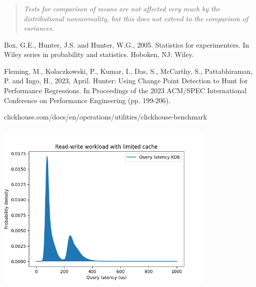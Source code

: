 \documentclass[usenames,dvipsnames, 18pt, compress, aspectratio=169]{beamer}
\begin{document}
\begin{frame}
    \frametitle{}
    \begin{center}
        \blockquote{\it Tests for comparison of means are not affected very much by
            the distributional nonnormality, but this does not extend to the
            comparison of variances.}

        \begin{flushright}
            \fontsize{10pt}{0}\selectfont
            Box, G.E., Hunter, J.S. and Hunter, W.G., 2005. Statistics for
            experimenters. In Wiley series in probability and statistics. Hoboken,
            NJ: Wiley.
        \end{flushright}

    \end{center}

    \linespread{0.5}
    \vspace{0.5cm}
    \color{black}\fontsize{6pt}{0}\selectfont
        Fleming, M., Kolaczkowski, P., Kumar, I., Das, S., McCarthy, S.,
        Pattabhiraman, P. and Ingo, H., 2023, April. Hunter: Using Change Point
        Detection to Hunt for Performance Regressions. In Proceedings of the
        2023 ACM/SPEC International Conference on Performance Engineering (pp.
        199-206).

    \color{black}\fontsize{6pt}{0}\selectfont
        clickhouse.com/docs/en/operations/utilities/clickhouse-benchmark

    \linespread{1.5}

\end{frame}

\begin{frame}
    \frametitle{}
    \begin{center}
        \includegraphics[width=0.8\textwidth,center]{bimodal-dist.png}
    \end{center}
\end{frame}
\end{document}
